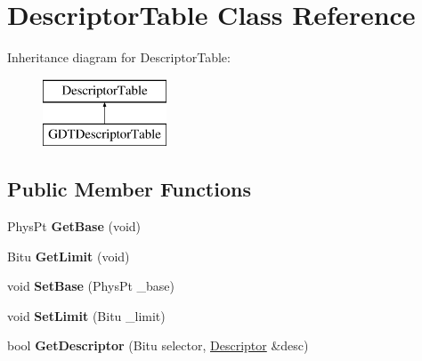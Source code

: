 \hypertarget{classDescriptorTable}{\section{Descriptor\-Table Class Reference}
\label{classDescriptorTable}
}
Inheritance diagram for Descriptor\-Table\-:\begin{figure}[H]
\begin{center}
\leavevmode
\includegraphics[height=2.000000cm]{classDescriptorTable}
\end{center}
\end{figure}
\subsection*{Public Member Functions}
\begin{DoxyCompactItemize}
\item 
\hypertarget{classDescriptorTable_ae54a870057bdd285ba1c84bf4e7cda15}{Phys\-Pt {\bfseries Get\-Base} (void)}\label{classDescriptorTable_ae54a870057bdd285ba1c84bf4e7cda15}

\item 
\hypertarget{classDescriptorTable_adb94c93c4eef56259f861d9004231b80}{Bitu {\bfseries Get\-Limit} (void)}\label{classDescriptorTable_adb94c93c4eef56259f861d9004231b80}

\item 
\hypertarget{classDescriptorTable_a615d69b99e491d50023e9feca950583f}{void {\bfseries Set\-Base} (Phys\-Pt \-\_\-base)}\label{classDescriptorTable_a615d69b99e491d50023e9feca950583f}

\item 
\hypertarget{classDescriptorTable_a537ad64528d292f9c7c791d8a754da35}{void {\bfseries Set\-Limit} (Bitu \-\_\-limit)}\label{classDescriptorTable_a537ad64528d292f9c7c791d8a754da35}

\item 
\hypertarget{classDescriptorTable_a5b7215649b48adf865cb4ca21c5e2a1d}{bool {\bfseries Get\-Descriptor} (Bitu selector, \hyperlink{classDescriptor}{Descriptor} \&desc)}\label{classDescriptorTable_a5b7215649b48adf865cb4ca21c5e2a1d}

\end{DoxyCompactItemize}
